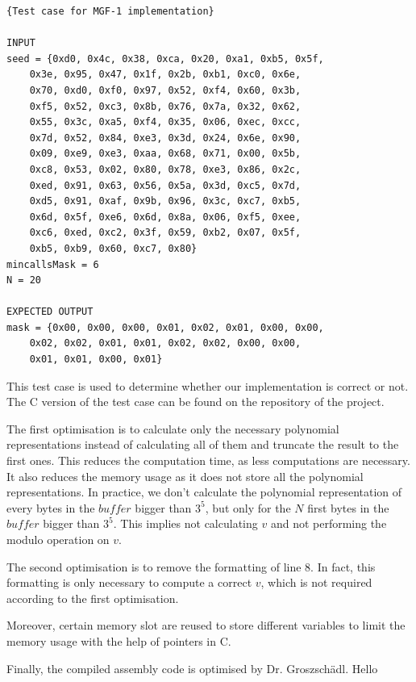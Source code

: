 \begin{lstlisting}[style=base,frame=single,mathescape=true]
{Test case for MGF-1 implementation}

INPUT 
seed = {0xd0, 0x4c, 0x38, 0xca, 0x20, 0xa1, 0xb5, 0x5f,
	0x3e, 0x95, 0x47, 0x1f, 0x2b, 0xb1, 0xc0, 0x6e,
	0x70, 0xd0, 0xf0, 0x97, 0x52, 0xf4, 0x60, 0x3b,
	0xf5, 0x52, 0xc3, 0x8b, 0x76, 0x7a, 0x32, 0x62,
	0x55, 0x3c, 0xa5, 0xf4, 0x35, 0x06, 0xec, 0xcc,
	0x7d, 0x52, 0x84, 0xe3, 0x3d, 0x24, 0x6e, 0x90,
	0x09, 0xe9, 0xe3, 0xaa, 0x68, 0x71, 0x00, 0x5b,
	0xc8, 0x53, 0x02, 0x80, 0x78, 0xe3, 0x86, 0x2c,
	0xed, 0x91, 0x63, 0x56, 0x5a, 0x3d, 0xc5, 0x7d,
	0xd5, 0x91, 0xaf, 0x9b, 0x96, 0x3c, 0xc7, 0xb5,
	0x6d, 0x5f, 0xe6, 0x6d, 0x8a, 0x06, 0xf5, 0xee,
	0xc6, 0xed, 0xc2, 0x3f, 0x59, 0xb2, 0x07, 0x5f,
	0xb5, 0xb9, 0x60, 0xc7, 0x80}
mincallsMask = 6
N = 20

EXPECTED OUTPUT
mask = {0x00, 0x00, 0x00, 0x01, 0x02, 0x01, 0x00, 0x00, 
	0x02, 0x02, 0x01, 0x01, 0x02, 0x02, 0x00, 0x00,
	0x01, 0x01, 0x00, 0x01}
\end{lstlisting}

This test case is used to determine whether our implementation is correct or not. The C version of the test case can be found on the repository of the project. %




The first optimisation is to calculate only the necessary polynomial representations instead of calculating all of them and truncate the result to the first ones. This reduces the computation time, as less computations are necessary. It also reduces the memory usage as it does not store all the polynomial representations. In practice, we don't calculate the polynomial representation of every bytes in the $buffer$ bigger than $3^5$, but only for the $N$ first bytes in the $buffer$ bigger than $3^5$. This implies not calculating $v$ and not performing the modulo operation on $v$. 

The second optimisation is to remove the formatting of line 8. In fact, this formatting is only necessary to compute a correct $v$, which is not required according to the first optimisation.

Moreover, certain memory slot are reused to store different variables to limit the memory usage with the help of pointers in C.

Finally, the compiled assembly code is optimised by Dr. Groszsch\"adl. Hello







